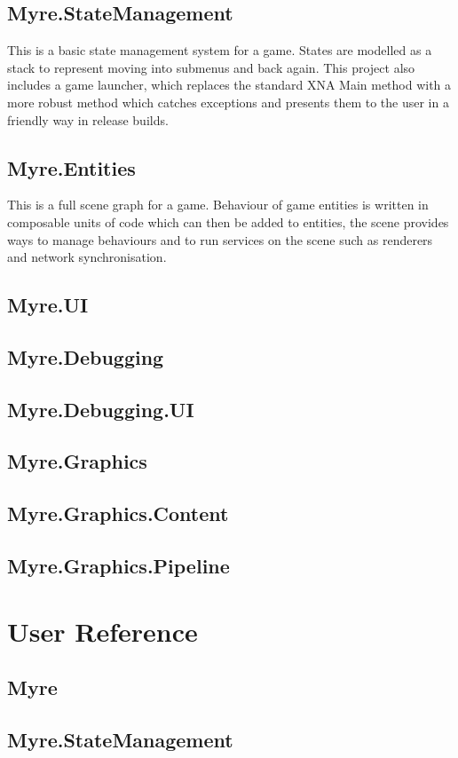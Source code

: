 \documentclass{article}
\begin{document}
\subsection{Myre.StateManagement}
This is a basic state management system for a game. States are modelled as a stack to represent moving into submenus and back again. This project also includes a game launcher, which replaces the standard XNA Main method with a more robust method which catches exceptions and presents them to the user in a friendly way in release builds.
\subsection{Myre.Entities}
This is a full scene graph for a game. Behaviour of game entities is written in composable units of code which can then be added to entities, the scene provides ways to manage behaviours and to run services on the scene such as renderers and network synchronisation.
\subsection{Myre.UI}
\subsection{Myre.Debugging}
\subsection{Myre.Debugging.UI}
\subsection{Myre.Graphics}
\subsection{Myre.Graphics.Content}
\subsection{Myre.Graphics.Pipeline}

\section{User Reference}
\subsection{Myre}
\subsection{Myre.StateManagement}
\end{document}
